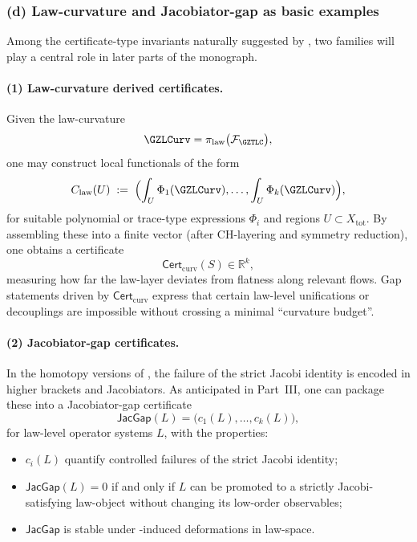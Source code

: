 \documentclass[11pt]{book}
\theoremstyle{plain}
\theoremstyle{definition}
\begin{document}
\subsubsection*{(d) Law-curvature and Jacobiator-gap as basic examples}

Among the certificate-type invariants naturally suggested by \GZTLC,
two families will play a central role in later parts of the monograph.

\paragraph{(1) Law-curvature derived certificates.}

Given the law-curvature
\[
   \GZLCurv
   = \pi_{\mathrm{law}}\bigl(\mathcal{F}_{\GZTLC}\bigr),
\]
  one may construct local functionals of the form
\[
   C_{\mathrm{law}}(U)
   \;:=\;
   \Bigl(
     \int_U \Phi_1(\GZLCurv),\dots,
     \int_U \Phi_k(\GZLCurv)
   \Bigr),
\]
for suitable polynomial or trace-type expressions $\Phi_i$ and regions
$U\subset X_{\mathrm{tot}}$. By assembling these into a finite vector
(after CH-layering and symmetry reduction), one obtains a certificate
  \[
     \mathsf{Cert}_{\mathrm{curv}}(S)\in\mathbb{R}^k,
  \]
  measuring how far the law-layer deviates from flatness along relevant
  flows. Gap statements driven by $\mathsf{Cert}_{\mathrm{curv}}$ express
  that certain law-level unifications or decouplings are impossible
  without crossing a minimal “curvature budget”.


\paragraph{(2) Jacobiator-gap certificates.}

In the homotopy versions of \GAlgebra, the failure of the strict Jacobi
identity is encoded in higher brackets and Jacobiators. As anticipated
in Part~III, one can package these into a Jacobiator-gap certificate
  \[
     \mathsf{JacGap}(L)
     = \bigl(c_1(L),\dots,c_k(L)\bigr),
  \]
  for law-level operator systems $L$, with the properties:

\begin{itemize}
  \item $c_i(L)$ quantify controlled failures of the strict Jacobi
        identity;
  \item $\mathsf{JacGap}(L)=0$ if and only if $L$ can be promoted to a
        strictly Jacobi-satisfying law-object without changing its
        low-order observables;
	  \item $\mathsf{JacGap}$ is stable under \GZTLC-induced deformations
	        in law-space.
  \end{itemize}
\end{document}
